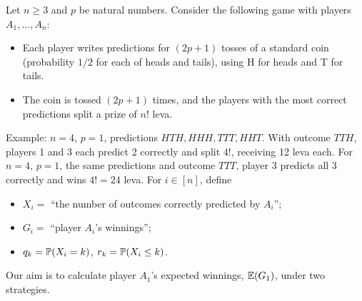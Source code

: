\documentclass[11pt,a4paper]{article}
\begin{document}
\begin{problem}[5 points]
Let $n\ge3$ and $p$ be natural numbers. Consider the following game with players $A_1,\ldots,A_n$:
\begin{itemize}
\item Each player writes predictions for $(2p+1)$ tosses of a standard coin
(probability $1/2$ for each of heads and tails), using H for heads and T for tails.
\item The coin is tossed $(2p+1)$ times, and the players with the most correct
predictions split a prize of $n!$ leva.
\end{itemize}
Example: $n=4$, $p=1$, predictions $HTH,HHH,TTT,HHT$. With outcome $TTH$,
players 1 and 3 each predict 2 correctly and split $4!$, receiving 12 leva each.
For $n=4$, $p=1$, the same predictions and outcome $TTT$, player 3 predicts all
3 correctly and wins $4!=24$ leva.
For $i\in[n]$, define
\begin{itemize}
\item $X_i=$ ``the number of outcomes correctly predicted by $A_i$'';
\item $G_i=$ ``player $A_i$'s winnings'';
\item $q_k=\P(X_i=k)$, $r_k=\P(X_i\le k)$.
\end{itemize}
Our aim is to calculate player $A_1$'s expected winnings, $\E(G_1)$, under two strategies.


\end{problem}
\end{document}
